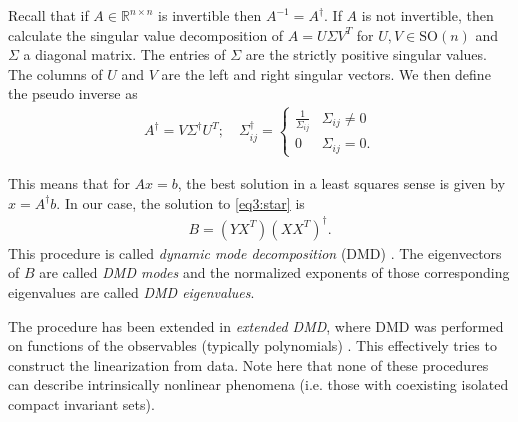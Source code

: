Recall that if $A \in \mathbb{R}^{n\times n}$ is invertible then $A^{-1} = A^{\dagger}$. If $A$ is not invertible, then calculate the singular value decomposition of $A = U \Sigma V^{T}$ for $U,V \in  \textrm{SO} (n)$ and $\Sigma$ a diagonal matrix. The entries of $\Sigma$ are the strictly positive singular values. The columns of $U$ and $V$ are the left and right singular vectors. We then define the pseudo inverse as
\begin{align}
	A^{\dagger} = V \Sigma^{\dagger} U^{T};\quad \Sigma_{ij}^{\dagger} = 
	\begin{cases}
		\frac{1}{\Sigma_{ij}} & \Sigma_{ij} \neq 0\\
		0 & \Sigma_{ij}=0.
	\end{cases}
\end{align}

This means that for $Ax=b$, the best solution in a least squares sense is given by $x= A^{\dagger}b$. In our case, the solution to \ref{eq3:star} is 
\begin{align}
	B = \left(Y X^{T}\right) \left( XX^{T}\right)^{\dagger}.
\end{align}
This procedure is called \emph{dynamic mode decomposition} (DMD) \cite{Schmid2010, Kutz2016}. The eigenvectors of $B$ are called \emph{DMD modes} and the normalized exponents of those corresponding eigenvalues are called \emph{DMD eigenvalues}.

The procedure has been extended in \emph{extended DMD}, where DMD was performed on functions of the observables (typically polynomials) \cite{Williams2015}. This effectively tries to construct the linearization from data. Note here that none of these procedures can describe intrinsically nonlinear phenomena (i.e. those with coexisting isolated compact invariant sets). 

